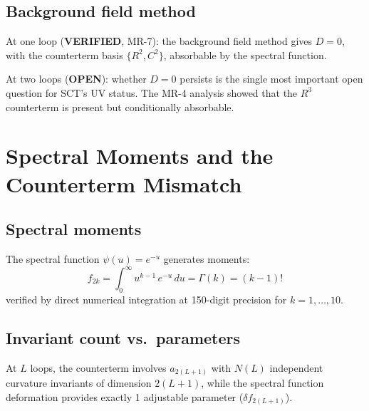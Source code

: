 \documentclass[12pt,a4paper]{article}
\begin{document}
\subsection{Background field method}

At one loop (\textbf{VERIFIED}, MR-7): the background field method gives
$D = 0$, with the counterterm basis $\{R^2, C^2\}$, absorbable by the
spectral function.

At two loops (\textbf{OPEN}): whether $D = 0$ persists is the single
most important open question for SCT's UV status. The MR-4 analysis showed
that the $R^3$ counterterm is present but conditionally absorbable.

\section{Spectral Moments and the Counterterm Mismatch}
\label{sec:moments}

\subsection{Spectral moments}

The spectral function $\psi(u) = e^{-u}$ generates moments:
\begin{equation}\label{eq:moments}
  f_{2k} = \int_0^\infty u^{k-1}\,e^{-u}\,du = \Gamma(k) = (k-1)!
\end{equation}
verified by direct numerical integration at 150-digit precision for $k = 1, \ldots, 10$.

\subsection{Invariant count vs.\ parameters}

At $L$ loops, the counterterm involves $a_{2(L+1)}$ with $N(L)$ independent
curvature invariants of dimension $2(L+1)$, while the spectral function
deformation provides exactly 1 adjustable parameter ($\delta f_{2(L+1)}$).
\end{document}
